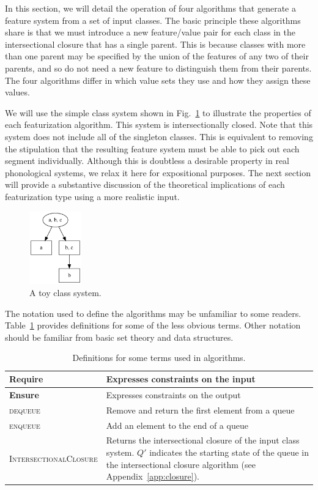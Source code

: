 \documentclass[12pt, oneside]{article}   	%
\begin{document}
In this section, we will detail the operation of four algorithms that generate a feature system from a set of input classes. The basic principle these algorithms share is that we must introduce a new feature/value pair for each class in the intersectional closure that has a single parent. This is because classes with more than one parent may be specified by the union of the features of any two of their parents, and so do not need a new feature to distinguish them from their parents. The four algorithms differ in which value sets they use and how they assign these values.

We will use the simple class system shown in Fig.~\ref{fig:toy_system} to illustrate the properties of each featurization algorithm. This system is intersectionally closed. Note that this system does not include all of the singleton classes. This is equivalent to removing the stipulation that the resulting feature system must be able to pick out each segment individually. Although this is doubtless a desirable property in real phonological systems, we relax it here for expositional purposes. The next section will provide a substantive discussion of the theoretical implications of each featurization type using a more realistic input.

\begin{figure}[htb!]
	\centering
	\includegraphics[width=0.2\textwidth]{toy_system_privative.png}
	\caption{A toy class system.}
	\label{fig:toy_system}
\end{figure}

The notation used to define the algorithms may be unfamiliar to some readers. Table~\ref{table:algorithm_definitions} provides definitions for some of the less obvious terms. Other notation should be familiar from basic set theory and data structures.

\begin{table}
	\centering
	\begin{tabular}{|l|p{9cm}|}
		\hline
		\textbf{Require} & Expresses constraints on the input \\
		\hline
		\textbf{Ensure} & Expresses constraints on the output \\
		\hline
		\textsc{dequeue} & Remove and return the first element from a queue \\
		\hline
		\textsc{enqueue} & Add an element to the end of a queue \\
		\hline
		\textsc{IntersectionalClosure} & Returns the intersectional closure of the input class system. $Q'$ indicates the starting state of the queue in the intersectional closure algorithm (see Appendix~\ref{app:closure}). \\
		\hline
	\end{tabular}
	\caption{Definitions for some terms used in algorithms.}
	\label{table:algorithm_definitions}
\end{table}
\end{document}
